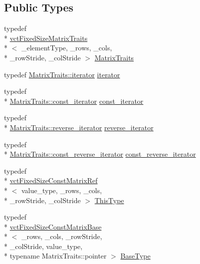 \subsection*{Public Types}
\begin{DoxyCompactItemize}
\item 
typedef \\*
\hyperlink{classvct_fixed_size_matrix_traits}{vct\-Fixed\-Size\-Matrix\-Traits}\\*
$<$ \-\_\-element\-Type, \-\_\-rows, \-\_\-cols, \\*
\-\_\-row\-Stride, \-\_\-col\-Stride $>$ \hyperlink{classvct_fixed_size_const_matrix_ref_ac6b99932c13ec23f2c083fc719af757e}{Matrix\-Traits}
\item 
typedef \hyperlink{classvct_fixed_size_matrix_traits_a677065481ada218e2559cdec92e97fd8}{Matrix\-Traits\-::iterator} \hyperlink{classvct_fixed_size_const_matrix_ref_aabd708b8d6137ad684ee64e121c645b2}{iterator}
\item 
typedef \\*
\hyperlink{classvct_fixed_size_matrix_traits_a8f7178fb03f45772c705fba16e08065d}{Matrix\-Traits\-::const\-\_\-iterator} \hyperlink{classvct_fixed_size_const_matrix_ref_ab035e90a0971ab4bf03d819b5bd31ecc}{const\-\_\-iterator}
\item 
typedef \\*
\hyperlink{classvct_fixed_size_matrix_traits_aa132098455575ae9bc4962c994273baa}{Matrix\-Traits\-::reverse\-\_\-iterator} \hyperlink{classvct_fixed_size_const_matrix_ref_a1c9aa87e0184cf645405b6c8618f1223}{reverse\-\_\-iterator}
\item 
typedef \\*
\hyperlink{classvct_fixed_size_matrix_traits_a362cff0931f811552609307e80af3eab}{Matrix\-Traits\-::const\-\_\-reverse\-\_\-iterator} \hyperlink{classvct_fixed_size_const_matrix_ref_a65f582be5b2d72ce89267a7255605844}{const\-\_\-reverse\-\_\-iterator}
\item 
typedef \\*
\hyperlink{classvct_fixed_size_const_matrix_ref}{vct\-Fixed\-Size\-Const\-Matrix\-Ref}\\*
$<$ value\-\_\-type, \-\_\-rows, \-\_\-cols, \\*
\-\_\-row\-Stride, \-\_\-col\-Stride $>$ \hyperlink{classvct_fixed_size_const_matrix_ref_a725e99847915984b03843f96054b07d5}{This\-Type}
\item 
typedef \\*
\hyperlink{classvct_fixed_size_const_matrix_base}{vct\-Fixed\-Size\-Const\-Matrix\-Base}\\*
$<$ \-\_\-rows, \-\_\-cols, \-\_\-row\-Stride, \\*
\-\_\-col\-Stride, value\-\_\-type, \\*
typename Matrix\-Traits\-::pointer $>$ \hyperlink{classvct_fixed_size_const_matrix_ref_ac3466e6a4fd2ab31f5f15265e09006d3}{Base\-Type}
\end{DoxyCompactItemize}

